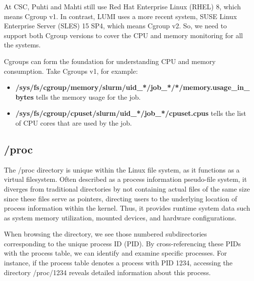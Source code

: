 At CSC, Puhti and Mahti still use Red Hat Enterprise Linux (RHEL) 8, which means Cgroup v1. In contrast, LUMI uses a more recent system, SUSE Linux Enterprise Server (SLES) 15 SP4, which means Cgroup v2. So, we need to support both Cgroup versions to cover the CPU and memory monitoring for all the systems.

Cgroups can form the foundation for understanding CPU and memory consumption. Take Cgroups v1, for example:

\begin{itemize}
    \item \textbf{/sys/fs/cgroup/memory/slurm/uid\_*/job\_*/*/memory.usage\_in\_bytes} tells the memory usage for the job.
    \item \textbf{/sys/fs/cgroup/cpuset/slurm/uid\_*/job\_*/cpuset.cpus} tells the list of CPU cores that are used by the job.
\end{itemize}

\subsection{/proc}
The /proc \cite{5544096} directory is unique within the Linux file system, as it functions as a virtual filesystem. Often described as a process information pseudo-file system, it diverges from traditional directories by not containing actual files of the same size since these files serve as pointers, directing users to the underlying location of process information within the kernel. Thus, it provides runtime system data such as system memory utilization, mounted devices, and hardware configurations.



When browsing the directory, we see those numbered subdirectories corresponding to the unique process ID (PID). By cross-referencing these PIDs with the process table, we can identify and examine specific processes. For instance, if the process table denotes a process with PID 1234, accessing the directory /proc/1234 reveals detailed information about this process.
    
